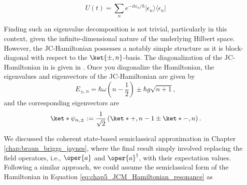 \begin{equation}
U(t) = \sum_n e^{-i t \epsilon_n/\hbar} \lvert \epsilon_n \rangle \langle \epsilon_n \rvert
\end{equation}

Finding such an eigenvalue decomposition is not trivial, particularly in this context, 
given the infinite-dimensional nature of the underlying Hilbert space. However, the 
JC-Hamiltonian possesses a notably simple structure as it is block-diagonal with respect 
to the $\ket{\pm, n}$-basis. The diagonalization of the JC-Hamiltonian in 
 is given in  .
Once you diagonalize the Hamiltonian, the eigenvalues and eigenvectors of the JC-Hamiltonian are given by
\begin{equation}
        \label{eq:chap5_JCM_eigenvalues}
        E_{\pm, n} = \hbar \omega \left(n - \frac{1}{2}\right) \pm \hbar g \sqrt{n + 1},
\end{equation}
and the corresponding eigenvectors are
\begin{equation}
        \label{eq:chap5_JCM_eigenvectors}
        \ket*{\psi_{n,\pm}} := \frac{1}{\sqrt{2}} 
     \left( \ket*{+, n - 1} \pm \ket*{-, n} \right).
\end{equation}

We discussed the coherent state-based semiclassical approximation in Chapter 
\ref{chap:braun_briggs_jaynes}, where the final result simply involved replacing 
the field operators, i.e., \( \oper{a} \) and \( \oper{a}^\dagger \), with their 
expectation values. Following a similar approach, we could assume the semiclassical form 
of the Hamiltonian in Equation \ref{eq:chap5_JCM_Hamiltonian_resonance} as

